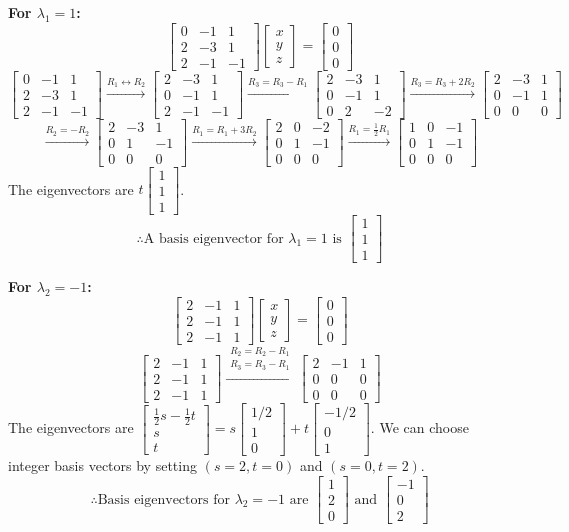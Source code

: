 \documentclass{article}
\newcommand{\mat}[1]{\begin{bmatrix} #1 \end{bmatrix}}
\newcommand{\vect}[1]{\begin{bmatrix} #1 \end{bmatrix}}
\begin{document}
\textbf{For $\lambda_1 = 1$:}
\[
	\mat{ 0 & -1 & 1 \\ 2 & -3 & 1 \\ 2 & -1 & -1 } \vect{x \\ y \\ z} = \vect{0 \\ 0 \\ 0}
\]
\[
	\mat{ 0 & -1 & 1 \\ 2 & -3 & 1 \\ 2 & -1 & -1 }
	\xrightarrow{R_1 \leftrightarrow R_2}
	\mat{ 2 & -3 & 1 \\ 0 & -1 & 1 \\ 2 & -1 & -1 }
	\xrightarrow{R_3 = R_3 - R_1}
	\mat{ 2 & -3 & 1 \\ 0 & -1 & 1 \\ 0 & 2 & -2 }
	\xrightarrow{R_3 = R_3 + 2R_2}
	\mat{ 2 & -3 & 1 \\ 0 & -1 & 1 \\ 0 & 0 & 0 }
\]
\[
	\xrightarrow{R_2 = -R_2}
	\mat{ 2 & -3 & 1 \\ 0 & 1 & -1 \\ 0 & 0 & 0 }
	\xrightarrow{R_1 = R_1 + 3R_2}
	\mat{ 2 & 0 & -2 \\ 0 & 1 & -1 \\ 0 & 0 & 0 }
	\xrightarrow{R_1 = \frac{1}{2}R_1}
	\mat{ 1 & 0 & -1 \\ 0 & 1 & -1 \\ 0 & 0 & 0 }
\]
The eigenvectors are $t \vect{1 \\ 1 \\ 1}$.
\[
	\therefore \text{A basis eigenvector for } \lambda_1 = 1 \text{ is } \vect{1 \\ 1 \\ 1}
\]

\textbf{For $\lambda_2 = -1$:}
\[
	\mat{ 2 & -1 & 1 \\ 2 & -1 & 1 \\ 2 & -1 & 1 } \vect{x \\ y \\ z} = \vect{0 \\ 0 \\ 0}
\]
\[
	\mat{ 2 & -1 & 1 \\ 2 & -1 & 1 \\ 2 & -1 & 1 }
	\xrightarrow{\substack{R_2 = R_2 - R_1 \\ R_3 = R_3 - R_1}}
	\mat{ 2 & -1 & 1 \\ 0 & 0 & 0 \\ 0 & 0 & 0 }
\]
The eigenvectors are $\vect{ \frac{1}{2}s - \frac{1}{2}t \\ s \\ t } = s \vect{1/2 \\ 1 \\ 0} + t \vect{-1/2 \\ 0 \\ 1}$.
We can choose integer basis vectors by setting $(s=2, t=0)$ and $(s=0, t=2)$.
\[
	\therefore \text{Basis eigenvectors for } \lambda_2 = -1 \text{ are } \vect{1 \\ 2 \\ 0} \text{ and } \vect{-1 \\ 0 \\ 2}
\]
\end{document}
